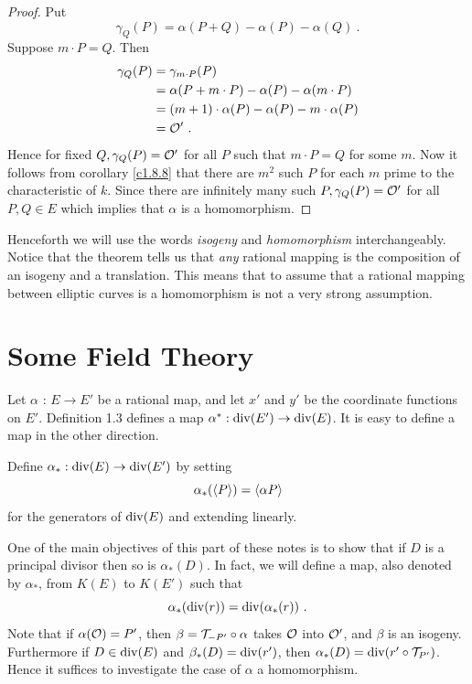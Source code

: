 \begin{proof}
Put
$$
\gamma_{Q}(P)=\alpha(P+Q)-\alpha(P)-\alpha(Q)\ .
$$
Suppose $m\cdot P=Q$. Then
\begin{align*}
\gamma_{Q}(P)&=\gamma_{m\cdot P}(P)\\
&=\alpha(P+m\cdot P)-\alpha(P)-\alpha(m\cdot P)\\
&=(m+1)\cdot\alpha(P)-\alpha(P)-m\cdot\alpha(P)\\
&=\mathcal{O}'\ .
\end{align*}
Hence for fixed $Q,\gamma_{Q}(P)=\mathcal{O}'$ for all $P$ such that $m\cdot P=Q$ for some $m$. Now it follows from corollary \ref{c1.8.8} that there are $m^{2}$ such $P$ for each $m$ prime to the characteristic of $k$. Since there are infinitely many such $P,\gamma_{Q}(P)=\mathcal{O}'$ for all $P,Q\in E$ which implies that $\alpha$ is a homomorphism.
\end{proof}
Henceforth we will use the words {\it isogeny} and {\it homomorphism} interchangeably. Notice that the theorem tells us that {\it any} rational mapping is the composition of an isogeny and a translation. This means that to assume that a rational mapping between elliptic curves is a homomorphism is not a very strong assumption.

\section{Some Field Theory}
\label{sec2.3}

Let $\alpha$ : $E\rightarrow E'$ be a rational map, and let $x'$ and $y'$ be the coordinate functions on $E'$. Definition 1.3 defines a map $\alpha^{*}:\operatorname{div}(E')\rightarrow \operatorname{div}(E)$. It is easy to define a map in the other direction.

\begin{defi}
\label{d2.3.7}
Define $\alpha_{*}:\operatorname{div}(E)\rightarrow \operatorname{div}(E')$ by setting
\[\alpha_{*}(\left\langle P \right \rangle) = \left\langle \alpha{P} \right \rangle\]
for the generators of $\operatorname{div}(E)$ and extending linearly.
\end{defi}

One of the main objectives of this part of these notes is to show that if $D$ is a principal divisor then so is $\alpha_{*}(D)$. In fact, we will define a map, also denoted by $\alpha_{*}$, from $K(E)$ to $K(E')$ such that
$$
\alpha_{*}(\on{div}(r))=\on{div}(\alpha_{*}(r))\ .
$$
Note that if $\alpha(\mathcal{O})=P'$, then $\beta=\mathcal{T}_{-P'}\circ\alpha$ takes $\mathcal{O}$ into $\mathcal{O}'$, and $\beta$ is an isogeny. Furthermore if $D\in \operatorname{div}(E)$ and $\beta_{*}(D)=\operatorname{div}(r')$, then $\alpha_{*}(D)=\operatorname{div}(r'\circ \mathcal{T}_{P'})$. Hence it suffices to investigate the case of $\alpha$ a homomorphism.


